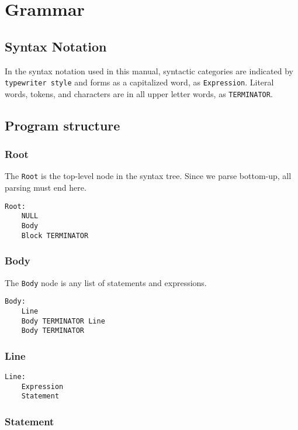 \documentclass[10pt]{report}
\begin{document}
\chapter{Grammar}
\label{chap:grammar}

\section{Syntax Notation}
\label{sec:syn_notation}

In the syntax notation used in this manual, syntactic categories are indicated by \texttt{typewriter style} and forms as a capitalized word, as \texttt{Expression}. Literal words, tokens, and characters are in all upper letter words, as \texttt{TERMINATOR}.

\section{Program structure}
\label{sec:structure}

\subsection{Root}

The \texttt{Root} is the top-level node in the syntax tree. Since we parse bottom-up, all parsing must end here.
\begin{verbatim}
Root:
    NULL
    Body
    Block TERMINATOR
\end{verbatim}

\subsection{Body}

The \texttt{Body} node is any list of statements and expressions.
\begin{verbatim}
Body:
    Line
    Body TERMINATOR Line
    Body TERMINATOR
\end{verbatim}

\subsection{Line}

\begin{verbatim}
Line:
    Expression
    Statement
\end{verbatim}

\subsection{Statement}
\end{document}
